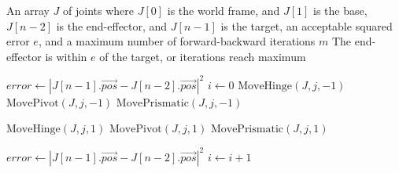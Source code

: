 \begin{algorithm}
\caption{FABRIK Algorithm}
\label{alg:fabrik}
\footnotesize{
\begin{algorithmic}[1]
    \Require An array $J$ of joints where $J[0]$ is the world frame, and $J[1]$ is the base, $J[n-2]$ is the end-effector, and $J[n-1]$ is the target, an acceptable squared error $e$, and a maximum number of forward-backward iterations $m$
    \Ensure The end-effector is within $e$ of the target, or iterations reach maximum
    
        \State $error\gets |J[n-1].\vec{pos}-J[n-2].\vec{pos}|^2$
        \State $i\gets 0$
                    \State $\text{MoveHinge}(J, j, -1)$
                    \State $\text{MovePivot}(J, j, -1)$
                    \State $\text{MovePrismatic}(J, j, -1)$
                \EndIf
            \EndFor
            \Statex

                    \State $\text{MoveHinge}(J, j, 1)$
                    \State $\text{MovePivot}(J, j, 1)$
                    \State $\text{MovePrismatic}(J, j, 1)$
                \EndIf
            \EndFor
            \Statex

            \State $error\gets |J[n-1].\vec{pos}-J[n-2].\vec{pos}|^2$
            \State $i\gets i+1$
        \EndWhile
    \EndFunction
\end{algorithmic}
}
\end{algorithm}

